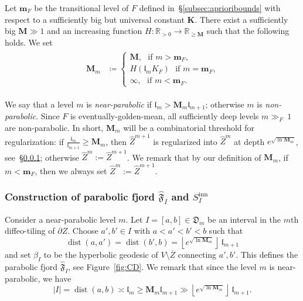 \documentclass[11pt, reqno]{amsart}
\numberwithin{equation}{section}
\theoremstyle{plain}
\theoremstyle{theorem}
\theoremstyle{plain}
\theoremstyle{definition}
\newcommand{\R}{\mathbb{R}}
\DeclareMathOperator{\dist}{dist}
\numberwithin{figure}{section}
\newcommand{\hide}[1]{}
\newcommand{\bM}{{\mathbf M}}
\newcommand{\wZ}{{\widehat Z}}
\newcommand{\bK}{{\mathbf K}}
\newcommand{\bbm}{{\mathbf m}}
\newcommand{\length}{{\mathfrak l}}
\newcommand\inn{{\operatorname{inn}}}
\begin{document}
Let $\bbm_F$ be the transitional level of $F$ defined in~\S\ref{subsec:aprioribounds} with respect to a sufficiently big but universal constant $\bK$. There exist a sufficiently big $\bM\gg 1$ and an increasing function $H\colon \R_{>0}\to \R_{\ge \bM}$ such that the following holds. We set
\begin{align}
    \label{eq:dfn:bM} 
    \begin{split}
    \bM_m &\coloneqq \begin{cases}
    \bM, \,\, \text{ if $m>\bbm_F$,}\\
     H(\length _m K_F) \,\, \text{ if $m = \bbm_F$,}\\
    \infty, \,\, \text{ if $m < \bbm_F$.}
\end{cases}      
    \end{split}
\end{align} 


 We say that a level $m$ is \emph{near-parabolic} if $\length_{m}> \bM_m \length_{m+1}$; otherwise $m$ is \emph{non-parabolic}. Since $F$ is eventually-golden-mean, all sufficiently deep levels $m\gg_F\  1$ are non-parabolic.
 In short, $\bM_m$ will be a combinatorial threshold for regularization: if $\frac{\length_{m}}{\length_{m+1}}\ge \bM_m$, then $\wZ^{m+1}$ is regularized into $\wZ^m$ at depth $e^{\sqrt{ \ln \bM_{m}}}$, see~\S\ref{sss:dfn:regular}; otherwise $\wZ^m:=\wZ^{m+1}$. 
 We remark that by our definition of $\bM_m$, if $m<\bbm_F$, then we always set $\wZ^m := \wZ^{m+1}$.

\hide{In short, $\bM_m$ will be a combinatorial threshold for regularization: if $\frac{\length_{m}}{\length_{m+1}}\ge \bM$ and $m> \bbm_F$, where $\bbm_F$ is the transition level defined in~\S\ref{subsec:aprioribounds}, then $\wZ^{m+1}$ is regularized into $\wZ^m$ at depth $\bM_{\sqrt{\ln}}$, see~\S\ref{sss:dfn:regular}; otherwise $\wZ^m:=\wZ^{m+1}$. If $m<\bbm_F$, then we always set $\wZ^m := \wZ^{m+1}$. The case $m=\bbm_F$ is discussed in~\S\ref{sss:dfn:regular:m_G}.}



\subsubsection{Construction of parabolic fjord $\widehat{\mathfrak F}_I$ and $S^\inn _I$}\label{sss:dfn:regular} Consider a near-parabolic level $m$. Let $I=[a,b]\in \mathfrak{D}_m$ be an interval in the $m$th diffeo-tiling of $\partial Z$. Choose $a', b'\in I$ with $a<a'<b'<b$ such that \[\dist(a,a')=\dist(b',b) =\left\lfloor e^{\sqrt{ \ln \bM_{m}}}\right\rfloor \  \length_{m+1} \]
and set $\beta_I$ to be the hyperbolic geodesic of $V\setminus \overline Z$ connecting $a',b'$. This defines the parabolic fjord $\widehat{\mathfrak F}_I$, see Figure~\ref{fig:CD}.
We remark that since the level $m$ is near-parabolic, we have
$$
|I| = \dist(a,b) \asymp \length_m \geq \bM_m \length_{m+1} \gg \left\lfloor e^{\sqrt{ \ln \bM_{m}}}\right\rfloor \  \length_{m+1}.
$$
\end{document}
